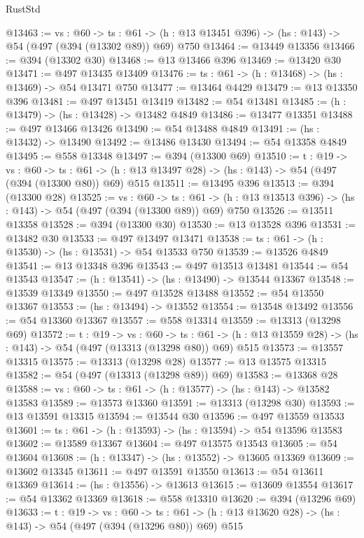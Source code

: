 \begin{lexlean}{RustStd}
\begin{coremodule}
@13463 := {vs : @60} ->
  {ts : @61} -> (h : @13 @13451 @396) -> (hs : @143) -> @54 (@497 (@394 (@13302 @89)) @69) @750
@13464 := @13449 @13356
@13466 := @394 (@13302 @30)
@13468 := @13 @13466 @396
@13469 := @13420 @30
@13471 := @497 @13435 @13409
@13476 := {ts : @61} -> (h : @13468) -> (hs : @13469) -> @54 @13471 @750
@13477 := @13464 @4429
@13479 := @13 @13350 @396
@13481 := @497 @13451 @13419
@13482 := @54 @13481
@13485 := (h : @13479) -> (hs : @13428) -> @13482 @4849
@13486 := @13477 @13351
@13488 := @497 @13466 @13426
@13490 := @54 @13488 @4849
@13491 := (hs : @13432) -> @13490
@13492 := @13486 @13430
@13494 := @54 @13358 @4849
@13495 := @558 @13348
@13497 := @394 (@13300 @69)
@13510 := {t : @19} ->
  {vs : @60} ->
  {ts : @61} -> (h : @13 @13497 @28) -> (hs : @143) -> @54 (@497 (@394 (@13300 @80)) @69) @515
@13511 := @13495 @396
@13513 := @394 (@13300 @28)
@13525 := {vs : @60} ->
  {ts : @61} -> (h : @13 @13513 @396) -> (hs : @143) -> @54 (@497 (@394 (@13300 @89)) @69) @750
@13526 := @13511 @13358
@13528 := @394 (@13300 @30)
@13530 := @13 @13528 @396
@13531 := @13482 @30
@13533 := @497 @13497 @13471
@13538 := {ts : @61} -> (h : @13530) -> (hs : @13531) -> @54 @13533 @750
@13539 := @13526 @4849
@13541 := @13 @13348 @396
@13543 := @497 @13513 @13481
@13544 := @54 @13543
@13547 := (h : @13541) -> (hs : @13490) -> @13544 @13367
@13548 := @13539 @13349
@13550 := @497 @13528 @13488
@13552 := @54 @13550 @13367
@13553 := (hs : @13494) -> @13552
@13554 := @13548 @13492
@13556 := @54 @13360 @13367
@13557 := @558 @13314
@13559 := @13313 (@13298 @69)
@13572 := {t : @19} ->
  {vs : @60} ->
  {ts : @61} -> (h : @13 @13559 @28) -> (hs : @143) -> @54 (@497 (@13313 (@13298 @80)) @69) @515
@13573 := @13557 @13315
@13575 := @13313 (@13298 @28)
@13577 := @13 @13575 @13315
@13582 := @54 (@497 (@13313 (@13298 @89)) @69)
@13583 := @13368 @28
@13588 := {vs : @60} -> {ts : @61} -> (h : @13577) -> (hs : @143) -> @13582 @13583
@13589 := @13573 @13360
@13591 := @13313 (@13298 @30)
@13593 := @13 @13591 @13315
@13594 := @13544 @30
@13596 := @497 @13559 @13533
@13601 := {ts : @61} -> (h : @13593) -> (hs : @13594) -> @54 @13596 @13583
@13602 := @13589 @13367
@13604 := @497 @13575 @13543
@13605 := @54 @13604
@13608 := (h : @13347) -> (hs : @13552) -> @13605 @13369
@13609 := @13602 @13345
@13611 := @497 @13591 @13550
@13613 := @54 @13611 @13369
@13614 := (hs : @13556) -> @13613
@13615 := @13609 @13554
@13617 := @54 @13362 @13369
@13618 := @558 @13310
@13620 := @394 (@13296 @69)
@13633 := {t : @19} ->
  {vs : @60} ->
  {ts : @61} -> (h : @13 @13620 @28) -> (hs : @143) -> @54 (@497 (@394 (@13296 @80)) @69) @515

\end{coremodule}
\end{lexlean}
